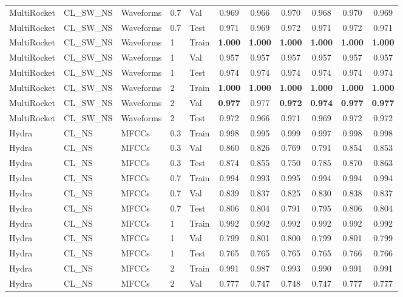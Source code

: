 \begin{landscape}
\begin{longtable}{|l|l|l|l|l|c|c|c|c|c|c|}
MultiRocket & CL\_SW\_NS & Waveforms & 0.7 & Val & 0.969 & 0.966 & 0.970 & 0.968 & 0.970 & 0.969 \\
MultiRocket & CL\_SW\_NS & Waveforms & 0.7 & Test & 0.971 & 0.969 & 0.972 & 0.971 & 0.972 & 0.971 \\
MultiRocket & CL\_SW\_NS & Waveforms & 1 & Train & \textbf{1.000} & \textbf{1.000} & \textbf{1.000} & \textbf{1.000} & \textbf{1.000} & \textbf{1.000} \\
MultiRocket & CL\_SW\_NS & Waveforms & 1 & Val & 0.957 & 0.957 & 0.957 & 0.957 & 0.957 & 0.957 \\
MultiRocket & CL\_SW\_NS & Waveforms & 1 & Test & 0.974 & 0.974 & 0.974 & 0.974 & 0.974 & 0.974 \\
MultiRocket & CL\_SW\_NS & Waveforms & 2 & Train & \textbf{1.000} & \textbf{1.000} & \textbf{1.000} & \textbf{1.000} & \textbf{1.000} & \textbf{1.000} \\
MultiRocket & CL\_SW\_NS & Waveforms & 2 & Val & \textbf{0.977} & 0.977 & \textbf{0.972} & \textbf{0.974} & \textbf{0.977} & \textbf{0.977} \\
MultiRocket & CL\_SW\_NS & Waveforms & 2 & Test & 0.972 & 0.966 & 0.971 & 0.969 & 0.972 & 0.972 \\
Hydra & CL\_NS & MFCCs & 0.3 & Train & 0.998 & 0.995 & 0.999 & 0.997 & 0.998 & 0.998 \\
Hydra & CL\_NS & MFCCs & 0.3 & Val & 0.860 & 0.826 & 0.769 & 0.791 & 0.854 & 0.853 \\
Hydra & CL\_NS & MFCCs & 0.3 & Test & 0.874 & 0.855 & 0.750 & 0.785 & 0.870 & 0.863 \\
Hydra & CL\_NS & MFCCs & 0.7 & Train & 0.994 & 0.993 & 0.995 & 0.994 & 0.994 & 0.994 \\
Hydra & CL\_NS & MFCCs & 0.7 & Val & 0.839 & 0.837 & 0.825 & 0.830 & 0.838 & 0.837 \\
Hydra & CL\_NS & MFCCs & 0.7 & Test & 0.806 & 0.804 & 0.791 & 0.795 & 0.806 & 0.804 \\
Hydra & CL\_NS & MFCCs & 1 & Train & 0.992 & 0.992 & 0.992 & 0.992 & 0.992 & 0.992 \\
Hydra & CL\_NS & MFCCs & 1 & Val & 0.799 & 0.801 & 0.800 & 0.799 & 0.801 & 0.799 \\
Hydra & CL\_NS & MFCCs & 1 & Test & 0.765 & 0.765 & 0.765 & 0.765 & 0.766 & 0.766 \\
Hydra & CL\_NS & MFCCs & 2 & Train & 0.991 & 0.987 & 0.993 & 0.990 & 0.991 & 0.991 \\
Hydra & CL\_NS & MFCCs & 2 & Val & 0.777 & 0.747 & 0.748 & 0.747 & 0.777 & 0.777 \\

\end{longtable}
\end{landscape}

